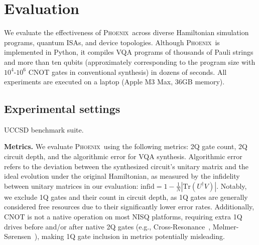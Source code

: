 \documentclass[conference,9pt]{IEEEtran}
\newcommand{\dquote}[1]{``#1''}
\newcommand{\phoenix}{\textsc{Phoenix}}
\newcommand{\CNOT}{\mathrm{CNOT}}
\begin{document}





\section{Evaluation}

We evaluate the effectiveness of \phoenix\ across diverse Hamiltonian simulation programs, quantum ISAs, and device topologies. Although \phoenix\ is implemented in Python, it compiles VQA programs of thousands of Pauli strings and more than ten qubits (approximately corresponding to the program size with $10^4$-$10^6$ $\CNOT$ gates in conventional synthesis) in dozens of seconds. All experiments are executed on a laptop (Apple M3 Max, 36GB memory).

\subsection{Experimental settings}


    \begin{table}[tbp]
        \centering
        \caption{UCCSD benchmark suite.}
        \setlength{\tabcolsep}{4.2pt}
        \scalebox{0.85}{
            
        }
        \label{tab:uccsd}
        
    \end{table}
        
    
    \textbf{Metrics.} We evaluate \phoenix\ using the following metrics: 2Q gate count, 2Q circuit depth, and the algorithmic error for VQA synthesis. Algorithmic error refers to the deviation between the synthesized circuit's unitary matrix and the ideal evolution under the original Hamiltonian, as measured by the infidelity between unitary matrices in our evaluation: $\mathrm{infid} = 1 - \frac{1}{N}|\mathrm{Tr}(U^\dagger V)|$. Notably, we exclude 1Q gates and their count in circuit depth, as 1Q gates are generally considered free resources due to their significantly lower error rates. Additionally, $\CNOT$ is not a native operation on most NISQ platforms, requiring extra 1Q drives before and/or after native 2Q gates (e.g., Cross-Resonance~\cite{rigetti2010fully}, Mølmer-Sørensen~\cite{bruzewicz2019trapped}), making 1Q gate inclusion in metrics potentially misleading.  %
    
\end{document}
